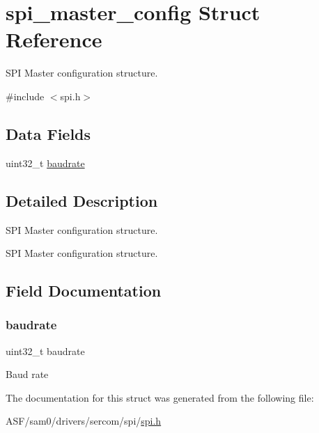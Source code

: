 \hypertarget{structspi__master__config}{}\section{spi\+\_\+master\+\_\+config Struct Reference}
\label{structspi__master__config}


S\+PI Master configuration structure.  




{\ttfamily \#include $<$spi.\+h$>$}

\subsection*{Data Fields}
\begin{DoxyCompactItemize}
\item 
uint32\+\_\+t \mbox{\hyperlink{structspi__master__config_ac4f06ea26ed6bd7ae83b92d64ac10b78}{baudrate}}
\end{DoxyCompactItemize}


\subsection{Detailed Description}
S\+PI Master configuration structure. 

S\+PI Master configuration structure. 

\subsection{Field Documentation}
\mbox{\label{structspi__master__config_ac4f06ea26ed6bd7ae83b92d64ac10b78}} 
\subsubsection{\texorpdfstring{baudrate}{baudrate}}
{\footnotesize\ttfamily uint32\+\_\+t baudrate}

Baud rate 

The documentation for this struct was generated from the following file\+:\begin{DoxyCompactItemize}
\item 
A\+S\+F/sam0/drivers/sercom/spi/\mbox{\hyperlink{spi_8h}{spi.\+h}}\end{DoxyCompactItemize}
